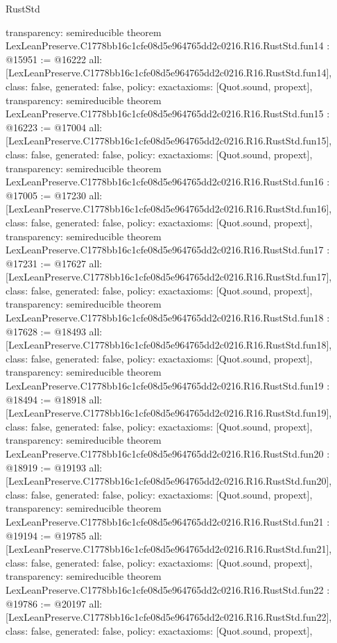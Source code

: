 \begin{lexlean}{RustStd}
\begin{coremodule}
{  transparency: semireducible
}
theorem LexLeanPreserve.C1778bb16c1cfe08d5e964765dd2c0216.R16.RustStd.fun14 : @15951 := @16222 {
  all: [LexLeanPreserve.C1778bb16c1cfe08d5e964765dd2c0216.R16.RustStd.fun14],
  class: false,
  generated: false,
  policy: exact{axioms: [Quot.sound, propext]},
  transparency: semireducible
}
theorem LexLeanPreserve.C1778bb16c1cfe08d5e964765dd2c0216.R16.RustStd.fun15 : @16223 := @17004 {
  all: [LexLeanPreserve.C1778bb16c1cfe08d5e964765dd2c0216.R16.RustStd.fun15],
  class: false,
  generated: false,
  policy: exact{axioms: [Quot.sound, propext]},
  transparency: semireducible
}
theorem LexLeanPreserve.C1778bb16c1cfe08d5e964765dd2c0216.R16.RustStd.fun16 : @17005 := @17230 {
  all: [LexLeanPreserve.C1778bb16c1cfe08d5e964765dd2c0216.R16.RustStd.fun16],
  class: false,
  generated: false,
  policy: exact{axioms: [Quot.sound, propext]},
  transparency: semireducible
}
theorem LexLeanPreserve.C1778bb16c1cfe08d5e964765dd2c0216.R16.RustStd.fun17 : @17231 := @17627 {
  all: [LexLeanPreserve.C1778bb16c1cfe08d5e964765dd2c0216.R16.RustStd.fun17],
  class: false,
  generated: false,
  policy: exact{axioms: [Quot.sound, propext]},
  transparency: semireducible
}
theorem LexLeanPreserve.C1778bb16c1cfe08d5e964765dd2c0216.R16.RustStd.fun18 : @17628 := @18493 {
  all: [LexLeanPreserve.C1778bb16c1cfe08d5e964765dd2c0216.R16.RustStd.fun18],
  class: false,
  generated: false,
  policy: exact{axioms: [Quot.sound, propext]},
  transparency: semireducible
}
theorem LexLeanPreserve.C1778bb16c1cfe08d5e964765dd2c0216.R16.RustStd.fun19 : @18494 := @18918 {
  all: [LexLeanPreserve.C1778bb16c1cfe08d5e964765dd2c0216.R16.RustStd.fun19],
  class: false,
  generated: false,
  policy: exact{axioms: [Quot.sound, propext]},
  transparency: semireducible
}
theorem LexLeanPreserve.C1778bb16c1cfe08d5e964765dd2c0216.R16.RustStd.fun20 : @18919 := @19193 {
  all: [LexLeanPreserve.C1778bb16c1cfe08d5e964765dd2c0216.R16.RustStd.fun20],
  class: false,
  generated: false,
  policy: exact{axioms: [Quot.sound, propext]},
  transparency: semireducible
}
theorem LexLeanPreserve.C1778bb16c1cfe08d5e964765dd2c0216.R16.RustStd.fun21 : @19194 := @19785 {
  all: [LexLeanPreserve.C1778bb16c1cfe08d5e964765dd2c0216.R16.RustStd.fun21],
  class: false,
  generated: false,
  policy: exact{axioms: [Quot.sound, propext]},
  transparency: semireducible
}
theorem LexLeanPreserve.C1778bb16c1cfe08d5e964765dd2c0216.R16.RustStd.fun22 : @19786 := @20197 {
  all: [LexLeanPreserve.C1778bb16c1cfe08d5e964765dd2c0216.R16.RustStd.fun22],
  class: false,
  generated: false,
  policy: exact{axioms: [Quot.sound, propext]},
}
\end{coremodule}
\end{lexlean}
